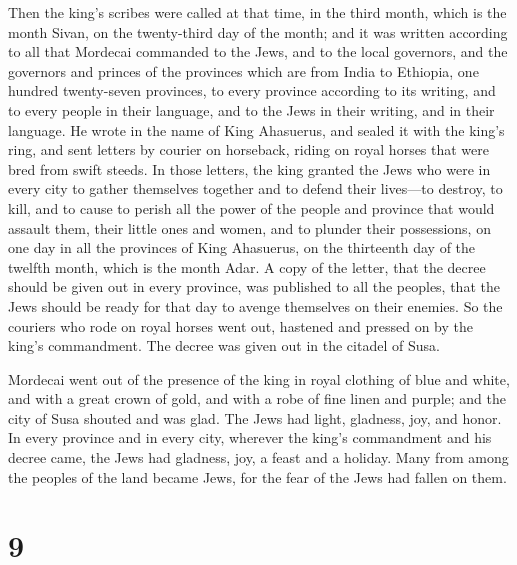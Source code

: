  Then the king's scribes were called at that time, in the
third month, which is the month Sivan, on the twenty-third day of the
month; and it was written according to all that Mordecai commanded to
the Jews, and to the local governors, and the governors and princes of
the provinces which are from India to Ethiopia, one hundred twenty-seven
provinces, to every province according to its writing, and to every
people in their language, and to the Jews in their writing, and in their
language.  He wrote in the name of King Ahasuerus, and
sealed it with the king's ring, and sent letters by courier on
horseback, riding on royal horses that were bred from swift steeds.
 In those letters, the king granted the Jews who were in
every city to gather themselves together and to defend their lives---to
destroy, to kill, and to cause to perish all the power of the people and
province that would assault them, their little ones and women, and to
plunder their possessions,  on one day in all the
provinces of King Ahasuerus, on the thirteenth day of the twelfth month,
which is the month Adar.  A copy of the letter, that the
decree should be given out in every province, was published to all the
peoples, that the Jews should be ready for that day to avenge themselves
on their enemies.  So the couriers who rode on royal
horses went out, hastened and pressed on by the king's commandment. The
decree was given out in the citadel of Susa.

 Mordecai went out of the presence of the king in royal
clothing of blue and white, and with a great crown of gold, and with a
robe of fine linen and purple; and the city of Susa shouted and was
glad.  The Jews had light, gladness, joy, and honor.
 In every province and in every city, wherever the king's
commandment and his decree came, the Jews had gladness, joy, a feast and
a holiday. Many from among the peoples of the land became Jews, for the
fear of the Jews had fallen on them.

\hypertarget{section-8}{%
\section{9}\label{section-8}}

